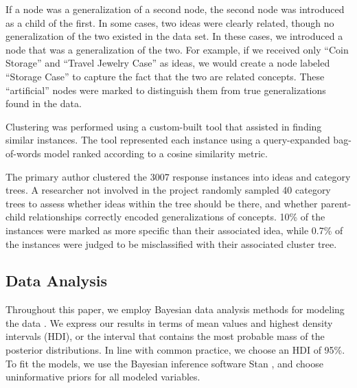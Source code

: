 If a node was a generalization of a second node, the second node was introduced as a child of the first. In some cases, two ideas were clearly related, though no generalization of the two existed in the data set. In these cases, we introduced a node that was a generalization of the two. For example, if we received only ``Coin Storage'' and ``Travel Jewelry Case'' as ideas, we would create a node labeled ``Storage Case'' to capture the fact that the two are related concepts. These ``artificial'' nodes were marked to distinguish them from true generalizations found in the data.

Clustering was performed using a custom-built tool that assisted in finding similar instances. The tool represented each instance using a query-expanded bag-of-words model ranked according to a cosine similarity metric.

The primary author clustered the 3007 response instances into ideas and category trees. A researcher not involved in the project randomly sampled 40 category trees to assess whether ideas within the tree should be there, and whether parent-child relationships correctly encoded generalizations of concepts. 10\% of the instances were marked as more specific than their associated idea, while 0.7\% of the instances were judged to be misclassified with their associated cluster tree.

\subsection{Data Analysis}
Throughout this paper, we employ Bayesian data analysis methods for modeling the data \cite{kruschke_doing_2010}. We express our results in terms of mean values and highest density intervals (HDI), or the interval that contains the most probable mass of the posterior distributions. In line with common practice, we choose an HDI of 95\%. To fit the models, we use the Bayesian inference software Stan \cite{stan-software:2013}, and choose uninformative priors for all modeled variables.





